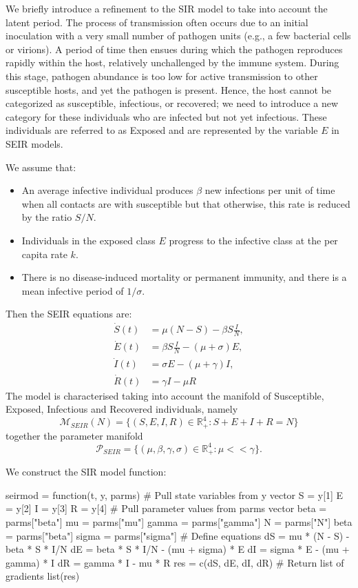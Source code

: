 \documentclass[12pt]{article}\usepackage[]{graphicx}\usepackage[]{color}
\begin{document}
We briefly introduce a refinement to the SIR model to take into account the latent period. The process of transmission often occurs due to an initial inoculation with a very small number of pathogen units (e.g., a few bacterial cells or virions). A period of time then ensues during which the pathogen reproduces rapidly within the host, relatively unchallenged by the immune system. During this stage, pathogen abundance is too low for active transmission to other susceptible hosts, and yet the pathogen is present. Hence, the host cannot be categorized as susceptible, infectious, or recovered; we need to introduce a new category for these individuals who are infected but not yet infectious. These individuals are referred to as Exposed and are represented by the variable $E$ in SEIR models.

We assume that:
\begin{itemize}
\item An average infective individual produces $\beta$ new infections per unit of time when all contacts are with susceptible but that otherwise, this rate is reduced by the ratio $S/N.$
\item Individuals in the exposed class $E$ progress to the infective class at the per capita rate $k.$
\item There is no disease-induced mortality or permanent immunity, and there is a mean infective period of $1/\sigma.$
\end{itemize}
Then the SEIR equations are:
\begin{align}
\dot{S}(t) & = \mu(N-S)-\beta S \frac{I}{N}, \label{SEIR1}\\
\dot{E}(t) & = \beta S \frac{I}{N} - (\mu+\sigma)E, \label{SEIR2} \\
\dot{I}(t) & = \sigma E - (\mu + \gamma)I, \label{SEIR3}\\
\dot{R}(t) & = \gamma I - \mu R \label{SEIR4}
\end{align}
The model is characterised taking into account the manifold of Susceptible, Exposed, Infectious and Recovered individuals, namely
$$
\mathcal{M}_{SEIR}(N) = \{(S,E,I,R) \in \mathbb{R}_+^4 : S+E+I+R = N\}
$$
together the parameter manifold
$$
\mathcal{P}_{SEIR} = \{(\mu,\beta,\gamma,\sigma) \in \mathbb{R}_+^4: \mu << \gamma\}.
$$

We construct the SIR model function:

\begin{Schunk}
\begin{Sinput}
seirmod = function(t, y, parms) {
  # Pull state variables from y vector
  S = y[1]
  E = y[2]
  I = y[3]
  R = y[4]
  # Pull parameter values from parms vector beta = parms["beta"]
  mu = parms["mu"]
  gamma = parms["gamma"]
  N = parms["N"]
  beta = parms["beta"]
  sigma = parms["sigma"]
  # Define equations
  dS = mu * (N - S) - beta * S * I/N
  dE = beta * S * I/N - (mu + sigma) * E
  dI = sigma * E  - (mu + gamma) * I 
  dR = gamma * I - mu * R
  res = c(dS, dE, dI, dR)
  # Return list of gradients
  list(res)
}
\end{Sinput}
\end{Schunk}
\end{document}
